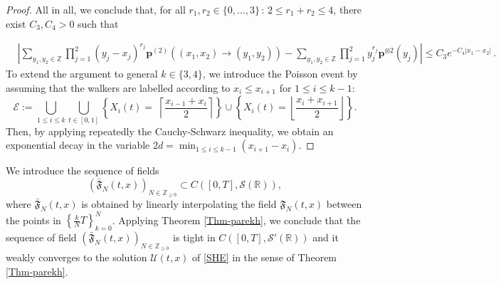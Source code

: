 \documentclass[a4paper,11pt,oneside,reqno]{amsart}
\theoremstyle{definition}
\renewcommand{\leq}{\leqslant}
\renewcommand{\geq}{\geqslant}
\numberwithin{equation}{section}
\begin{document}
\begin{proof}
 All in all, we conclude that, for all $r_{1},r_{2}\in \{0,\ldots,3\}\,:\, 2\leq r_{1}+r_{2}\leq 4$, there exist $C_{3},C_{4}>0$ such that

\begin{equation*}
	\begin{split}
		&\left|\sum_{y_{1},y_{2}\in \mathbb{Z}}\prod_{j=1}^{2}(y_{j}-x_{j})^{r_{j}}\mathbf{p}^{(2)}((x_{1},x_{2})\to(y_{1},y_{2}))-\sum_{y_{1},y_{2}\in \mathbb{Z}}\prod_{j=1}^{2}y_{j}^{r_{j}}\mathbf{p}^{\otimes 2}(y_{j})\right|\leq C_{3}e^{-C_{4}|x_{1}-x_{2}|}\,.
	\end{split}
\end{equation*}
To extend the argument to general $k\in \{3,4\}$, we introduce the Poisson event by assuming that the walkers are labelled according to $x_i\leq x_{i+1}$ for $1\leq i\leq k-1$:
\begin{equation*}
	\mathcal{E}:=\bigcup_{1\leq i\leq k} \bigcup_{t\in[0,1]}  \left\lbrace  X_{i}(t)=\;\left\lceil \frac{x_{i-1}+x_{i}}{2} \right\rceil \right\rbrace \cup\left\lbrace X_{i}(t)=\left\lfloor \frac{x_{i}+x_{i+1}}{2}\right\rfloor\right\rbrace.
\end{equation*}
Then, by applying repeatedly the Cauchy-Schwarz inequality, {\color{black} we obtain an exponential decay in the variable $2d=\min_{1\leq i\leq k-1}(x_{i+1}-x_{i})$.} 
\end{proof}
We introduce the sequence of fields $$\left(\bar{\mathfrak{F}}_{N}(t,x)\right)_{N\in \mathbb{Z}_{\geq 0}}\subset C([0,T],\mathcal{S}(\mathbb{R})),$$ 
where $\bar{\mathfrak{F}}_{N}(t,x)$ is obtained by linearly interpolating the {\color{black}field} $\mathfrak{F}_{N}(t,x)$  between the points in $\left\{\frac{
k}{N}T\right\}_{k=0}^{N}$.
Applying Theorem \ref{Thm-parekh}, we conclude that the sequence of field  $\left(\bar{\mathfrak{F}}_{N}(t,x)\right)_{N\in \mathbb{Z}_{\geq 0}}$
 is tight in $C([0,T],\mathcal{S}'(\mathbb{R}))$ and it weakly converges to the solution $\mathcal{U}(t,x)$ of \eqref{SHE} in the sense of Theorem \ref{Thm-parekh}. 
\end{document}
